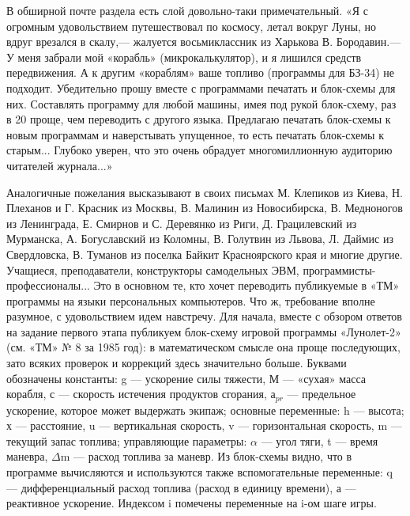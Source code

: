 \documentclass[11pt,a4paper,oneside]{article}
\begin{document}
В обширной почте раздела есть слой довольно-таки примечательный. «Я с огромным удовольствием путешествовал по космосу, летал вокруг Луны, но вдруг врезался в скалу,— жалуется восьмиклассник из Харькова В. Бородавин.— У меня забрали мой «корабль» (микрокалькулятор), и я лишился средств передвижения. А к другим «кораблям» ваше топливо (программы для БЗ-34) не подходит. Убедительно прошу вместе с программами печатать и блок-схемы для них. Составлять программу для любой машины, имея под рукой блок-схему, раз в 20 проще, чем переводить с другого языка. Предлагаю печатать блок-схемы к новым программам и наверстывать упущенное, то есть печатать блок-схемы к старым... Глубоко уверен, что это очень обрадует многомиллионную аудиторию читателей журнала...»

Аналогичные пожелания высказывают в своих письмах М. Клепиков из Киева, Н. Плеханов и Г. Красник из Москвы, В. Малинин из Новосибирска, В. Медноногов из Ленинграда, Е. Смирнов и С. Деревянко из Риги, Д. Грацилевский из Мурманска, А. Богуславский из Коломны, В. Голутвин из Львова, Л. Даймис из Свердловска, В. Туманов из поселка Байкит Красноярского края и многие другие. Учащиеся, преподаватели, конструкторы самодельных ЭВМ, программисты-профессионалы... Это в основном те, кто хочет переводить публикуемые в «ТМ» программы на языки персональных компьютеров. Что ж, требование вполне разумное, с удовольствием идем навстречу. Для начала, вместе с обзором ответов на задание первого этапа публикуем блок-схему игровой программы «Лунолет-2» (см. «ТМ» № 8 за 1985 год): в математическом смысле она проще последующих, зато всяких проверок и коррекций здесь значительно больше. Буквами обозначены константы: g — ускорение силы тяжести, М — «сухая» масса корабля, с — скорость истечения продуктов сгорания, а$_{pr}$ — предельное ускорение, которое может выдержать экипаж; основные переменные: h — высота; х — расстояние, u — вертикальная скорость, v — горизонтальная скорость, m — текущий запас топлива; управляющие параметры: $\alpha$ — угол тяги, t — время маневра, $\Delta$m — расход топлива за маневр. Из блок-схемы видно, что в программе вычисляются и используются также вспомогательные переменные: q — дифференциальный расход топлива (расход в единицу времени), а — реактивное ускорение. Индексом i помечены переменные на i-ом шаге игры.
\end{document}
